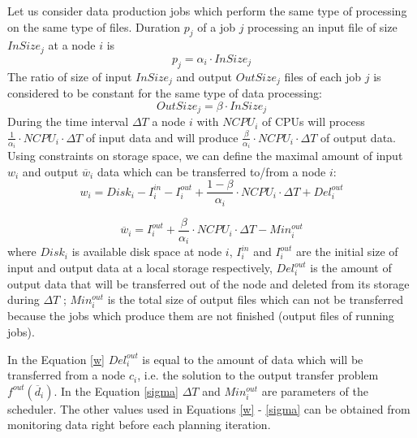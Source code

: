 Let us consider data production jobs which perform the same type of processing on the same type of files. Duration $p_{j}$ of a job $j$  processing an input file of size $InSize_{j}$ at a node $i$ is
\begin{equation}
\label{alpha}
p_{j} = \alpha_{i} \cdot InSize_{j} 
\end{equation}
The ratio of size of input $InSize_{j}$ and output $OutSize_{j}$ files of each job $j$ is considered to be constant for the same type of data processing:
\begin{equation}
\label{beta}
OutSize_{j} = \beta \cdot InSize_{j} 
\end{equation}
During the time interval $\Delta T$ a node $i$ with $NCPU_{i}$  of CPUs  will process $\frac{1}{\alpha_{i}} \cdot NCPU_{i} \cdot \Delta T$ of input data and will produce $\frac{\beta}{\alpha_{i}} \cdot NCPU_{i} \cdot \Delta T$ of output data.
Using constraints on storage space, we can define the maximal amount of input $w_{i}$ and output $\overline{w}_{i}$ data which can be transferred to/from a node $i$:
\begin{equation}
w_{i} =
Disk_{i} - I_{i}^{in} - I_{i}^{out} + \frac{1 - \beta}{\alpha_{i}} \cdot NCPU_{i} \cdot \Delta T + Del_{i}^{out}
\label{w}
\end{equation}

\begin{equation}
\label{sigma}
\overline{w}_{i} = I_{i}^{out} + \frac{\beta}{\alpha_{i}} \cdot NCPU_{i} \cdot \Delta T - Min_{i}^{out}
\end{equation}  
where $Disk_{i}$ is available disk space at node $i$, 
$I_{i}^{in}$ and $I_{i}^{out}$ are the initial size of input and output data at a local storage respectively,
$Del_{i}^{out}$ is the amount of output data that will be transferred out of the node and deleted from its storage during $\Delta T$ ; 
$Min_{i}^{out}$ is the total size of output files which can not be transferred because the jobs which produce them are not finished (output files of running jobs). 

In the Equation \ref{w} $Del_{i}^{out}$ is equal to the amount of data which will be transferred from a node $c_{i}$, i.e. the solution to the output transfer problem $f^{out}(\overline{d}_{i})$. In the Equation \ref{sigma} $\Delta T$ and  $Min_{i}^{out}$ are parameters of the scheduler. The other values used in Equations \ref{w} - \ref{sigma} can be obtained from monitoring data right before each planning iteration.

